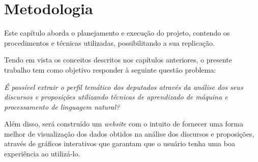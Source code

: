 \chapter{Metodologia}

Este capítulo aborda o planejamento e execução do projeto, contendo os procedimentos e técnicas utilizadas, possibilitando a sua  replicação.

Tendo em vista os conceitos descritos nos capítulos anteriores, o presente trabalho tem como objetivo responder à seguinte questão problema:

\begin{center}
\textit{É possível extrair o perfil temático dos deputados através da análise dos seus discursos e proposições utilizando técnicas de aprendizado de máquina e processamento de linguagem natural?}
\end{center}

Além disso, será construído um \textit{website} com o intuito de fornecer uma forma melhor de visualização dos dados obtidos na análise dos discursos e proposições, através de gráficos interativos que garantam que o usuário tenha uma boa experiência ao utilizá-lo.





